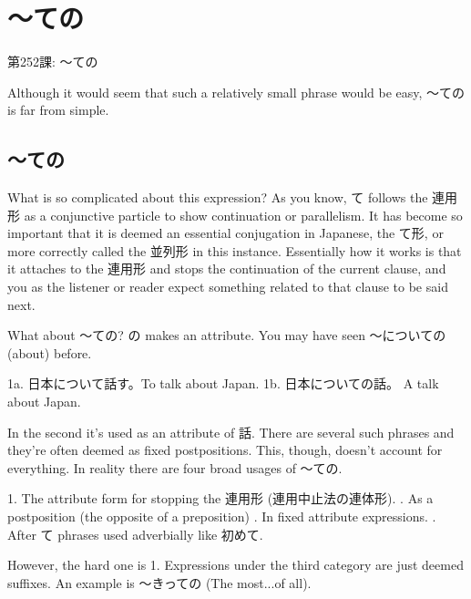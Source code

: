     
\chapter{～ての}

\begin{center}
\begin{Large}
第252課: ～ての  
\end{Large}
\end{center}
 
\par{ Although it would seem that such a relatively small phrase would be easy, ～ての is far from simple. }
      
\section{～ての}
 
\par{ What is so complicated about this expression? As you know, て follows the 連用形 as a conjunctive particle to show continuation or parallelism. It has become so important that it is deemed an essential conjugation in Japanese, the て形, or more correctly called the 並列形 in this instance. Essentially how it works is that it attaches to the 連用形 and stops the continuation of the current clause, and you as the listener or reader expect something related to that clause to be said next. }

\par{ What about ～ての? の makes an attribute. You may have seen ～についての (about) before. }

\par{1a. 日本について話す。To talk about Japan. \hfill\break
1b. 日本についての話。 A talk about Japan.  }

\par{ In the second it's used as an attribute of 話. There are several such phrases and they're often deemed as fixed postpositions. This, though, doesn't account for everything. In reality there are four broad usages of ～ての. }

\par{1. The attribute form for stopping the 連用形 (連用中止法の連体形). \hfill{}. As a postposition (the opposite of a preposition) \hfill{}. In fixed attribute expressions. \hfill{}. After て phrases used adverbially like 初めて. }

\par{ However, the hard one is 1. Expressions under the third category are just deemed suffixes. An example is ～きっての (The most\dothyp{}\dothyp{}\dothyp{}of all). }

